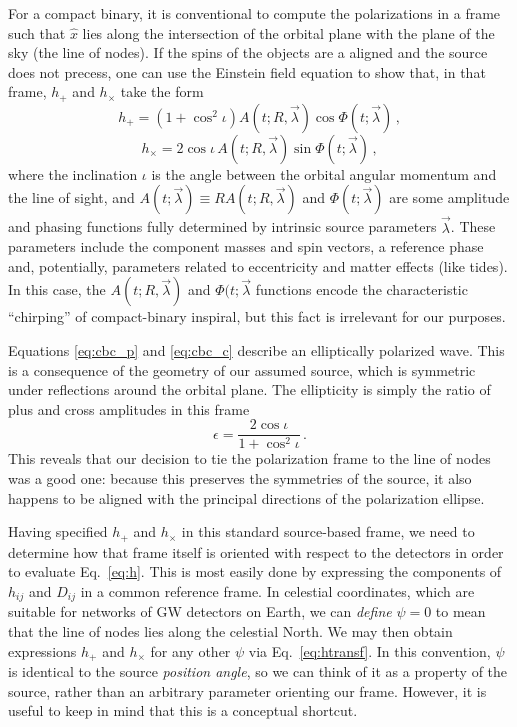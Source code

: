 \documentclass[aps,prd,twocolumn,superscriptaddress,preprintnumbers,floatfix,nofootinbib]{revtex4-2}
\newcommand{\beq}{\begin{equation}}
\newcommand{\eeq}{\end{equation}}
\newcommand*{\eq}[1]{Eq.~\eqref{eq:#1}}
\newcommand*{\mi}[1]{}
\newcommand*{\mi}[1]{{\color{magenta} [{\bf MAX}: #1]}}
\begin{document}
For a compact binary, it is conventional to compute the polarizations in a frame such that $\hat{x}$ lies along the intersection of the orbital plane with the plane of the sky (the line of nodes).
If the spins of the objects are a aligned and the source does not precess, one can use the Einstein field equation to show that, in that frame, $h_+$ and $h_\times$ take the form
\beq \label{eq:cbc_p}
h_+ = \left(1 + \cos^2 \iota\right) A(t; R, \vec{\lambda}) \cos \Phi(t; \vec{\lambda}) \, , 
\eeq
\beq \label{eq:cbc_c}
h_\times = 2 \cos \iota\, A(t; R, \vec{\lambda}) \sin \Phi(t; \vec{\lambda})\, ,
\eeq
where the inclination $\iota$ is the angle between the orbital angular momentum and the line of sight, and $A(t; \vec{\lambda}) \equiv R  A(t; R, \vec{\lambda})$ and $\Phi(t; \vec{\lambda})$ are some amplitude and phasing functions fully determined by intrinsic source parameters $\vec{\lambda}$.
These parameters include the component masses and spin vectors, a reference phase and, potentially, parameters related to eccentricity and matter effects (like tides).
In this case, the $A(t; R, \vec{\lambda})$ and $\Phi(t; \vec{\lambda}$ functions encode the characteristic ``chirping'' of compact-binary inspiral, but this fact is irrelevant for our purposes.

Equations \eqref{eq:cbc_p} and \eqref{eq:cbc_c} describe an elliptically polarized wave.
This is a consequence of the geometry of our assumed source, which is symmetric under reflections around the orbital plane.
The ellipticity is simply the ratio of plus and cross amplitudes in this frame \mi{check sign}
\beq
\epsilon = \frac{2 \cos\iota}{1 + \cos^2\iota}\, .
\eeq
This reveals that our decision to tie the polarization frame to the line of nodes was a good one: because this preserves the symmetries of the source, it also happens to be aligned with the principal directions of the polarization ellipse.

Having specified $h_+$ and $h_\times$ in this standard source-based frame, we need to determine how that frame itself is oriented with respect to the detectors in order to evaluate \eq{h}.
This is most easily done by expressing the components of $h_{ij}$ and $D_{ij}$ in a common reference frame.
In celestial coordinates, which are suitable for networks of GW detectors on Earth, we can \emph{define} $\psi = 0$ to mean that the line of nodes lies along the celestial North.
We may then obtain expressions $h_+$ and $h_\times$ for any other $\psi$ via \eq{htransf}.
In this convention, $\psi$ is identical to the source \emph{position angle}, so we can think of it as a property of the source, rather than an arbitrary parameter orienting our frame.
However, it is useful to keep in mind that this is a conceptual shortcut.
\end{document}
